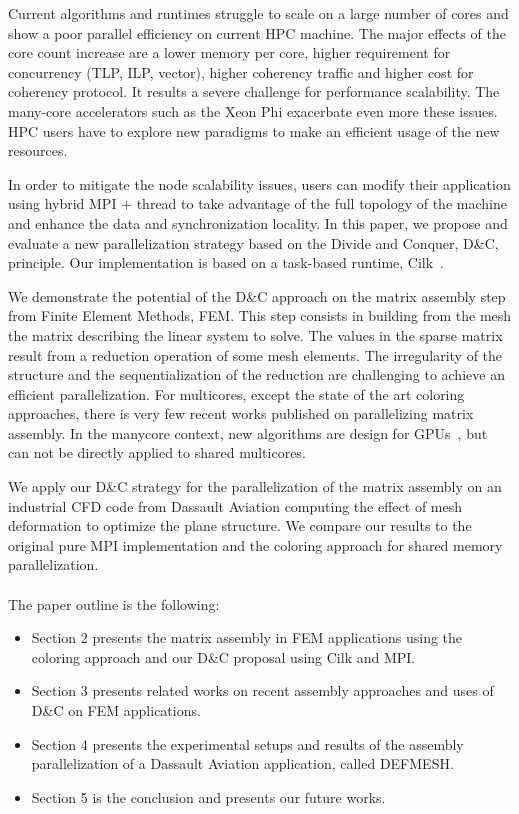 \documentclass{IOS-Book-Article}
\begin{document}
Current algorithms and runtimes struggle to scale on a large number of cores and show a poor parallel efficiency on current HPC machine. 
The major effects of the core count increase are a lower memory per core, higher requirement for concurrency (TLP, ILP, vector), higher coherency traffic and higher cost for coherency protocol.
It results a severe challenge for performance scalability. The many-core accelerators such as the Xeon Phi exacerbate even more these issues.
HPC users have to explore new paradigms to make an efficient usage of the new resources. 

In order to mitigate the node scalability issues, users can modify their application using hybrid MPI + thread to take advantage of the full topology of the machine and enhance the data and synchronization locality.
In this paper, we propose and evaluate a new parallelization strategy based on the Divide and Conquer, D\&C, principle. Our implementation is based on a task-based runtime, Cilk~\cite{cilk5}. 

We demonstrate the potential of the D\&C approach on the matrix assembly step from Finite Element Methods, FEM.
This step consists in building from the mesh the matrix describing the linear system to solve.
The values in the sparse matrix result from a reduction operation of some mesh elements.
The irregularity of the structure and the sequentialization of the reduction are challenging to achieve an efficient parallelization.
For multicores, except the state of the art coloring approaches, there is very few recent works published on parallelizing matrix assembly.
In the manycore context, new algorithms are design for GPUs~\cite{Stanford,CPUGPUasm}, but can not be directly applied to shared multicores.

We apply our D\&C strategy for the parallelization of the matrix assembly on an industrial CFD code from Dassault Aviation computing the effect of mesh deformation to optimize the plane structure.
We compare our results to the original pure MPI implementation and the coloring approach for shared memory parallelization.
\\\\
The paper outline is the following:
\begin{itemize}
\item Section 2 presents the matrix assembly in FEM applications using the coloring approach and our D\&C proposal using Cilk and MPI.
\item Section 3 presents related works on recent assembly approaches and uses of D\&C on FEM applications.
\item Section 4 presents the experimental setups and results of the assembly parallelization of a Dassault Aviation application, called DEFMESH.
\item Section 5 is the conclusion and presents our future works.
\end{itemize}
\end{document}

